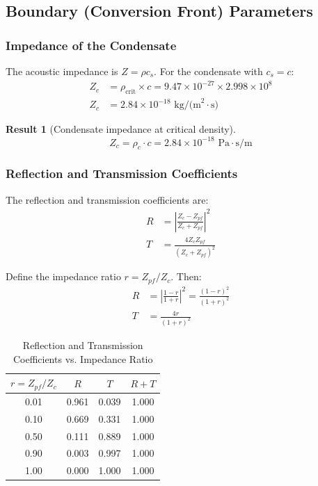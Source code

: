 \documentclass[11pt,a4paper]{article}
\newcommand{\ee}[1]{\times 10^{#1}}
\newcommand{\rhocrit}{\ensuremath{\rho_{\mathrm{crit}}}}
\newtheorem{result}{Result}
\begin{document}
\subsection{Boundary (Conversion Front) Parameters}
\label{sec:boundary}

\subsubsection{Impedance of the Condensate}

The acoustic impedance is $Z = \rho c_s$. For the condensate with $c_s = c$:
\begin{align}
Z_c &= \rhocrit \times c = 9.47 \ee{-27} \times 2.998 \ee{8} \nonumber \\
Z_c &= 2.84 \ee{-18} \text{ kg/(m}^2\cdot\text{s)}
\end{align}

\begin{result}[Condensate impedance at critical density]
\begin{equation}
\boxed{Z_c = \rho_c \cdot c = 2.84 \times 10^{-18} \text{ Pa}\cdot\text{s/m}}
\end{equation}
\end{result}

\subsubsection{Reflection and Transmission Coefficients}

The reflection and transmission coefficients are:
\begin{align}
R &= \left|\frac{Z_c - Z_{pf}}{Z_c + Z_{pf}}\right|^2 \\
T &= \frac{4 Z_c Z_{pf}}{(Z_c + Z_{pf})^2}
\end{align}

Define the impedance ratio $r = Z_{pf}/Z_c$. Then:
\begin{align}
R &= \left|\frac{1 - r}{1 + r}\right|^2 = \frac{(1-r)^2}{(1+r)^2} \\
T &= \frac{4r}{(1+r)^2}
\end{align}

\begin{table}[H]
\centering
\caption{Reflection and Transmission Coefficients vs. Impedance Ratio}
\label{tab:RT}
\begin{tabular}{@{}cccc@{}}
\toprule
$r = Z_{pf}/Z_c$ & $R$ & $T$ & $R + T$ \\
\midrule
0.01 & 0.961 & 0.039 & 1.000 \\
0.10 & 0.669 & 0.331 & 1.000 \\
0.50 & 0.111 & 0.889 & 1.000 \\
0.90 & 0.003 & 0.997 & 1.000 \\
1.00 & 0.000 & 1.000 & 1.000 \\
\bottomrule
\end{tabular}
\end{table}
\end{document}
